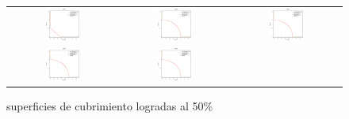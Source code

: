 \begin{figure}[H]
\caption{superficies de cubrimiento logradas al 50\%}%
\begin{tabular}{ccc}
  \includegraphics[width=0.33\textwidth]{Figures_Chapter7/Results_Chapter4/Surface_eps_VSD_MOEA/DTLZ1.eps}  &
  \includegraphics[width=0.33\textwidth]{Figures_Chapter7/Results_Chapter4/Surface_eps_VSD_MOEA/DTLZ2.eps} &
  \includegraphics[width=0.33\textwidth]{Figures_Chapter7/Results_Chapter4/Surface_eps_VSD_MOEA/DTLZ3.eps} \\
  \includegraphics[width=0.33\textwidth]{Figures_Chapter7/Results_Chapter4/Surface_eps_VSD_MOEA/DTLZ4.eps} &
  \includegraphics[width=0.33\textwidth]{Figures_Chapter7/Results_Chapter4/Surface_eps_VSD_MOEA/DTLZ5.eps} &

\end{tabular}
\end{figure}
